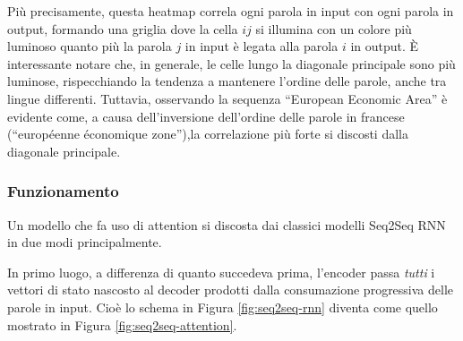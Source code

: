 \documentclass[12pt,a4paper,twoside,openright]{book}
\begin{document}
Più precisamente, questa heatmap correla ogni parola in input con ogni parola in output, formando una griglia dove la cella $ij$ si illumina con un colore più luminoso quanto più la parola $j$ in input è legata alla parola $i$ in output. È interessante notare che, in generale, le celle lungo la diagonale principale sono più luminose, rispecchiando la tendenza a mantenere l'ordine delle parole, anche tra lingue differenti. Tuttavia, osservando la sequenza ``European Economic Area'' è evidente come, a causa dell'inversione dell'ordine delle parole in francese (``européenne économique zone''),la correlazione più forte si discosti dalla diagonale principale.

\subsubsection{Funzionamento}
Un modello che fa uso di attention si discosta dai classici modelli Seq2Seq RNN in due modi principalmente. 

In primo luogo, a differenza di quanto succedeva prima, l'encoder passa \emph{tutti} i vettori di stato nascosto al decoder prodotti dalla consumazione progressiva delle parole in input. Cioè lo schema in Figura \ref{fig:seq2seq-rnn} diventa come quello mostrato in Figura \ref{fig:seq2seq-attention}.
\end{document}
